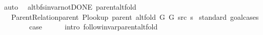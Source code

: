 \begin{isabellebody}
\ auto\isanewline
{}\isamarkupfalse%
%
\endisatagproof
{\isafoldproof}%
%
\isadelimproof
\isanewline
%
\endisadelimproof
\isanewline
{}\isamarkupfalse%
\ {\isacharparenleft}{\kern0pt}\ alt{\isacharunderscore}{\kern0pt}bfs{\isacharunderscore}{\kern0pt}invar{\isacharunderscore}{\kern0pt}not{\isacharunderscore}{\kern0pt}DONE{\isacharparenright}{\kern0pt}\ parent{\isacharunderscore}{\kern0pt}alt{\isacharunderscore}{\kern0pt}fold{\isacharcolon}{\kern0pt}\isanewline
\ \ \ {\isachardoublequoteopen}Parent{\isacharunderscore}{\kern0pt}Relation{\isachardot}{\kern0pt}parent\ {\isacharparenleft}{\kern0pt}P{\isacharunderscore}{\kern0pt}lookup\ {\isacharparenleft}{\kern0pt}parent\ {\isacharparenleft}{\kern0pt}alt{\isacharunderscore}{\kern0pt}fold\ G{}\ G{}\ src\ s{\isacharparenright}{\kern0pt}{\isacharparenright}{\kern0pt}{\isacharparenright}{\kern0pt}{\isachardoublequoteclose}\isanewline
%
\isadelimproof
%
\endisadelimproof
%
\isatagproof
{}\isamarkupfalse%
\ {\isacharparenleft}{\kern0pt}standard{\isacharcomma}{\kern0pt}\ goal{\isacharunderscore}{\kern0pt}cases{\isacharparenright}{\kern0pt}\isanewline
\ \ \isamarkupfalse%
\ {}\isanewline
\ \ \isamarkupfalse%
\ {\isacharquery}{\kern0pt}case\isanewline
\ \ \ \ \isamarkupfalse%
\ {\isacharparenleft}{\kern0pt}intro\ follow{\isacharunderscore}{\kern0pt}invar{\isacharunderscore}{\kern0pt}parent{\isacharunderscore}{\kern0pt}alt{\isacharunderscore}{\kern0pt}fold{\isacharparenright}{\kern0pt}\isanewline
{}\isamarkupfalse%
%
\endisatagproof
{\isafoldproof}%
%
\isadelimproof
%
\endisadelimproof
%
\isadelimdocument
%
\endisadelimdocument
%
\isatagdocument
%

\end{isabellebody}
